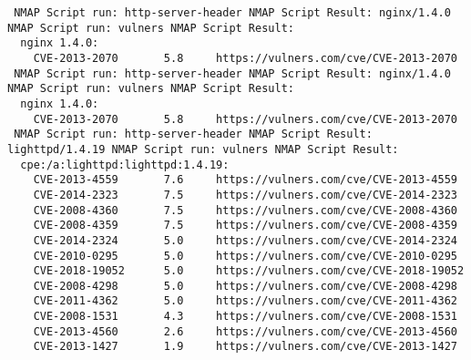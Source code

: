 \documentclass[12pt]{report}
\begin{document}
\begin{lstlisting}
 NMAP Script run: http-server-header NMAP Script Result: nginx/1.4.0 NMAP Script run: vulners NMAP Script Result: 
  nginx 1.4.0: 
	CVE-2013-2070		5.8		https://vulners.com/cve/CVE-2013-2070
 NMAP Script run: http-server-header NMAP Script Result: nginx/1.4.0 NMAP Script run: vulners NMAP Script Result: 
  nginx 1.4.0: 
	CVE-2013-2070		5.8		https://vulners.com/cve/CVE-2013-2070
 NMAP Script run: http-server-header NMAP Script Result: lighttpd/1.4.19 NMAP Script run: vulners NMAP Script Result: 
  cpe:/a:lighttpd:lighttpd:1.4.19: 
	CVE-2013-4559		7.6		https://vulners.com/cve/CVE-2013-4559
	CVE-2014-2323		7.5		https://vulners.com/cve/CVE-2014-2323
	CVE-2008-4360		7.5		https://vulners.com/cve/CVE-2008-4360
	CVE-2008-4359		7.5		https://vulners.com/cve/CVE-2008-4359
	CVE-2014-2324		5.0		https://vulners.com/cve/CVE-2014-2324
	CVE-2010-0295		5.0		https://vulners.com/cve/CVE-2010-0295
	CVE-2018-19052		5.0		https://vulners.com/cve/CVE-2018-19052
	CVE-2008-4298		5.0		https://vulners.com/cve/CVE-2008-4298
	CVE-2011-4362		5.0		https://vulners.com/cve/CVE-2011-4362
	CVE-2008-1531		4.3		https://vulners.com/cve/CVE-2008-1531
	CVE-2013-4560		2.6		https://vulners.com/cve/CVE-2013-4560
	CVE-2013-1427		1.9		https://vulners.com/cve/CVE-2013-1427

\end{lstlisting}
\pageref{LastPage}
\end{document}
